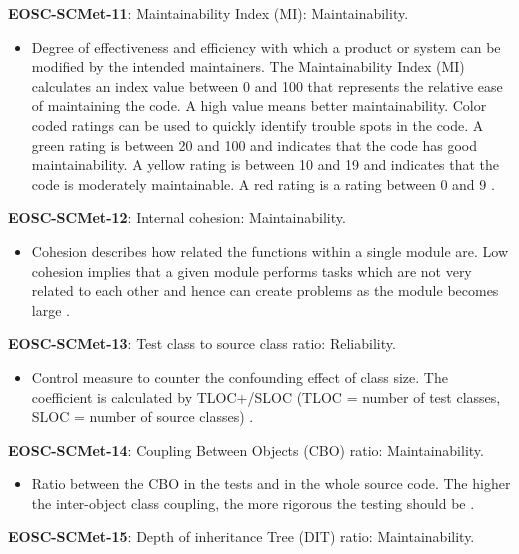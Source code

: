 \textbf{EOSC-SCMet-11}: Maintainability Index (MI): Maintainability.

\begin{itemize}
    \item Degree of effectiveness and efficiency with which a product or system can be modified by the intended maintainers. The Maintainability Index (MI) calculates an index value between 0 and 100 that represents the relative ease of maintaining the code. A high value means better maintainability. Color coded ratings can be used to quickly identify trouble spots in the code. A green rating is between 20 and 100 and indicates that the code has good maintainability. A yellow rating is between 10 and 19 and indicates that the code is moderately maintainable. A red rating is a rating between 0 and 9 \cite{iso_25010_2011_2017,montagud_systematic_2012}.
\end{itemize}

\textbf{EOSC-SCMet-12}: Internal cohesion: Maintainability.

\begin{itemize}
    \item Cohesion describes how related the functions within a single module are. Low cohesion implies that a given module performs tasks which are not very related to each other and hence can create problems as the module becomes large \cite{iso_iec_24765_2017,montagud_systematic_2012}.
\end{itemize}

\textbf{EOSC-SCMet-13}: Test class to source class ratio: Reliability.

\begin{itemize}
    \item Control measure to counter the confounding effect of class size. The coefficient is calculated by TLOC+/SLOC  (TLOC = number of test classes, SLOC = number of source classes) \cite{nagappan_early_2005}.
\end{itemize}

\textbf{EOSC-SCMet-14}: Coupling Between Objects (CBO) ratio: Maintainability.

\begin{itemize}
    \item Ratio between the CBO in the tests and in the whole source code. The higher the inter-object class coupling, the more rigorous the testing should be \cite{nagappan_early_2005}.
\end{itemize}

\textbf{EOSC-SCMet-15}: Depth of inheritance Tree (DIT) ratio: Maintainability.

